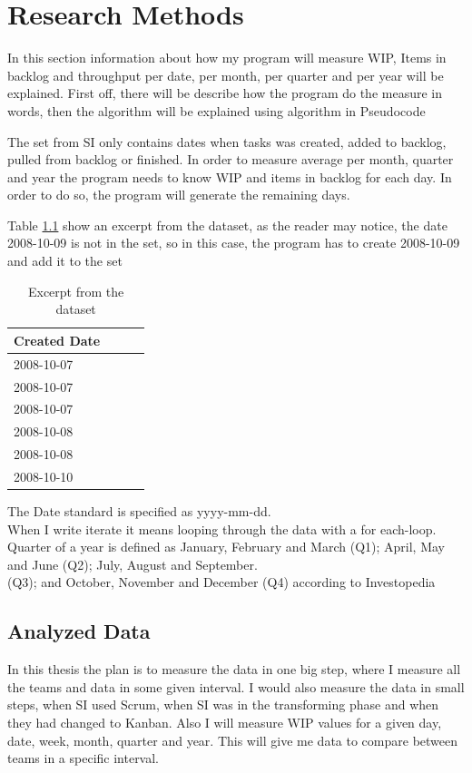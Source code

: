 \documentclass[UKenglish]{ifimaster}  %
\begin{document}
\chapter{Research Methods}
In this section information about how my program will measure WIP, Items in backlog and throughput per date, per month, per quarter and per year will be explained. First off, there will be describe how the program do the measure in words, then the algorithm will be explained using algorithm in Pseudocode \parencite{jd}

The set from SI only contains dates when tasks was created, added to backlog, pulled from backlog or finished.  In order to measure average per month, quarter and year the program needs to know WIP and items in backlog for each day. In order to do so, the program will generate the remaining days.

Table \ref {dataset} show an excerpt from the dataset, as the reader may notice, the date 2008-10-09 is not in the set, so in this case, the program has to create 2008-10-09 and add it to the set

\begin{table}[ht]
\begin{center}
    \begin{tabular}{| l | l | l | l |}
    \hline
    Created Date\\ \hline
    2008-10-07\\ \hline
    2008-10-07 \\ \hline
    2008-10-07 \\ \hline
    2008-10-08\\ \hline
    2008-10-08\\ \hline
   2008-10-10\\ \hline
    \end{tabular}
\caption{Excerpt from the dataset}
\label{dataset} %
\end{center}
\end{table}

The Date standard is specified as yyyy-mm-dd. \\
When I write iterate it means looping through the data with a for each-loop. \\
Quarter of a year is defined as January, February and March (Q1); April, May and June (Q2); July, August and September.\\ (Q3); and October, November and December (Q4) according to Investopedia \parencite{Quarter}

\section{Analyzed Data}
In this thesis the plan is to measure the data in one big step, where I measure all the teams and data in some given interval. I would also measure the data in small steps, when SI used Scrum, when SI was in the transforming phase and when they had changed to Kanban. Also I will measure WIP values for a given day, date, week, month, quarter and year. This will give me data to compare between teams in a specific interval.
\end{document}
